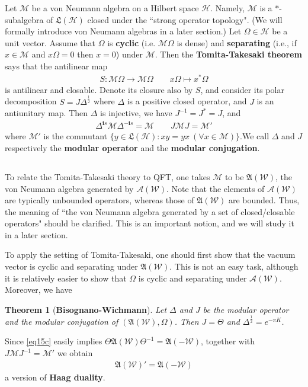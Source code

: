 \documentclass[12pt,b5paper,notitlepage]{article}
\theoremstyle{definition}
\theoremstyle{plain}
\newtheorem{thm}[df]{Theorem}
\newcommand{\fk}{\mathfrak}
\newcommand{\mc}{\mathcal}
\newcommand{\scr}{\mathscr}
\newcommand{\im}{\mathbf{i}}
\numberwithin{equation}{section}
\begin{document}
Let $\mc M$ be a von Neumann algebra on a Hilbert space $\mc H$. Namely, $\mc M$ is a $*$-subalgebra of $\fk L(\mc H)$ closed under the ``strong operator topology". (We will formally introduce von Neumann algebras in a later section.) Let $\Omega\in\mc H$ be a unit vector. Assume that $\Omega$ is \textbf{cyclic} (i.e. $\mc M\Omega$ is dense) and \textbf{separating} (i.e., if $x\in\mc M$ and $x\Omega=0$ then $x=0$) under $\mc M$. Then the \textbf{Tomita-Takesaki theorem} says that the antilinear map
\begin{align*}
S:\mc M\Omega\rightarrow\mc M\Omega\qquad x\Omega\mapsto x^*\Omega
\end{align*}
is antilinear and closable. Denote its closure also by $S$, and consider its polar decomposition $S=J\Delta^{\frac 12}$ where $\Delta$ is a positive closed operator, and $J$ is an antiunitary map. Then $\Delta$ is injective, we have $J^{-1}=J^*=J$, and
\begin{align*}
\Delta^{\im s}\mc M\Delta^{-\im s}=\mc M\qquad J\mc MJ=\mc M'
\end{align*}
where $\mc M'$ is the commutant $\{y\in\fk L(\mc H):xy=yx~(\forall x\in\mc M)\}$.We call $\Delta$ and $J$ respectively the \textbf{modular operator} and the \textbf{modular conjugation}.



\subsection{}



To relate the Tomita-Takesaki theory to QFT, one takes $\mc M$ to be $\fk A(\mc W)$, the von Neumann algebra generated by $\scr A(\mc W)$. Note that the elements of $\scr A(\mc W)$ are typically unbounded operators, whereas those of $\fk A(\mc W)$ are bounded. Thus, the meaning of ``the von Neumann algebra generated by a set of closed/closable operators" should be clarified. This is an important notion, and we will study it in a later section.


To apply the setting of Tomita-Takesaki, one should first show that the vacuum vector is cyclic and separating under $\fk A(\mc W)$. This is not an easy task, although it is relatively easier to show that $\Omega$ is cyclic and separating under $\scr A(\mc W)$. Moreover, we have
\begin{thm}[\textbf{Bisognano-Wichmann}]
Let $\Delta$ and $J$ be the modular operator and the modular conjugation of $(\fk A(\mc W),\Omega)$. Then $J=\Theta$ and $\Delta^{\frac 12}=e^{-\pi K}$.
\end{thm}
Since \eqref{eq15c} easily implies $\Theta\fk A(\mc W)\Theta^{-1}=\fk A(-\mc W)$, together with $J\mc M J^{-1}=\mc M'$ we obtain
\begin{align}
\fk A(\mc W)'=\fk A(-\mc W)
\end{align}
a version of \textbf{Haag duality}.
\end{document}
